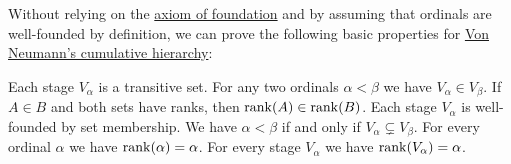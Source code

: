 \begin{proposition}\label{thm:cumulative_hierarchy_properties}
  Without relying on the \hyperref[def:zfc/foundation]{axiom of foundation} and by assuming that ordinals are well-founded by definition, we can prove the following basic properties for \hyperref[def:cumulative_hierarchy]{Von Neumann's cumulative hierarchy}:
  \begin{thmenum}
     Each stage \( V_\alpha \) is a transitive set.
     For any two ordinals \( \alpha < \beta \) we have \( V_\alpha \in V_\beta \).
     If \( A \in B \) and both sets have ranks, then \( \operatorname{rank}(A) \in \operatorname{rank}(B) \).
     Each stage \( V_\alpha \) is well-founded by set membership.
     We have \( \alpha < \beta \) if and only if \( V_\alpha \subsetneq V_\beta \).
     For every ordinal \( \alpha \) we have \( \operatorname{rank}(\alpha) = \alpha \).
     For every stage \( V_\alpha \) we have \( \operatorname{rank}(V_\alpha) = \alpha \).
  \end{thmenum}
\end{proposition}
